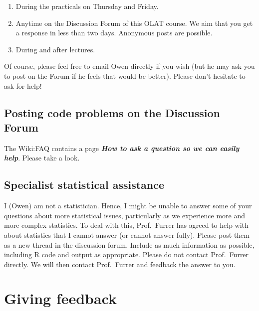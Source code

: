 \documentclass[
  letterpaper,
  8pt,
  a4paper]{book}
\providecommand{\tightlist}{%
  \setlength{\itemsep}{0pt}\setlength{\parskip}{0pt}}
\begin{document}
\begin{enumerate}
\def\labelenumi{\arabic{enumi}.}
\tightlist
\item
  During the practicals on Thursday and Friday.
\item
  Anytime on the Discussion Forum of this OLAT course. We aim that you
  get a response in less than two days. Anonymous posts are possible.
\item
  During and after lectures.
\end{enumerate}

Of course, please feel free to email Owen directly if you wish (but he
may ask you to post on the Forum if he feels that would be better).
Please don't hesitate to ask for help!

\subsection*{Posting code problems on the Discussion
Forum}\label{posting-code-problems-on-the-discussion-forum}

The Wiki:FAQ contains a page \textbf{\emph{How to ask a question so we
can easily help}}. Please take a look.

\subsection*{Specialist statistical
assistance}\label{specialist-statistical-assistance}

I (Owen) am not a statistician. Hence, I might be unable to answer some
of your questions about more statistical issues, particularly as we
experience more and more complex statistics. To deal with this,
Prof.~Furrer has agreed to help with about statistics that I cannot
answer (or cannot answer fully). Please post them as a new thread in the
discussion forum. Include as much information as possible, including R
code and output as appropriate. Please do not contact Prof.~Furrer
directly. We will then contact Prof.~Furrer and feedback the answer to
you.

\section*{Giving feedback}\label{giving-feedback}

\end{document}
